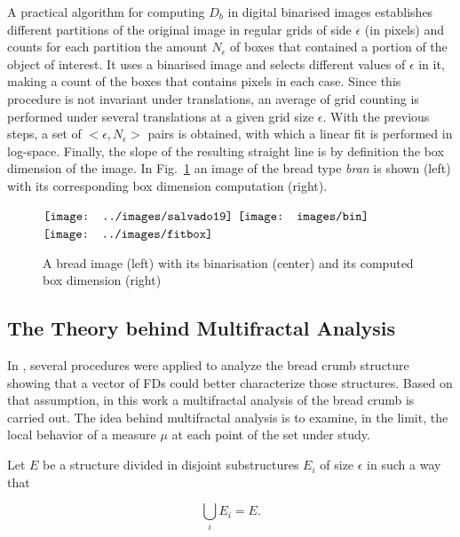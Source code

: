 A practical algorithm for computing $D_{b}$ in digital binarised images establishes different partitions of the original image in regular grids of side $\epsilon$ (in pixels) and counts for each partition the amount $N_{\epsilon}$ of boxes that contained a portion of the object of interest. It uses a binarised image and selects different values of $\epsilon$ in it, making a count of the boxes that contains pixels in each case. Since this procedure is not invariant under translations, an average of grid counting is performed under several translations at a given grid size $\epsilon$.­ With the previous steps, a set of $<\epsilon, N_\epsilon>$ pairs is obtained, with which a linear fit is performed in log-space. Finally, the slope of the resulting straight line is by definition the box dimension of the image. In Fig.~\ref{fig:fitbox} an image of the bread type {\em bran} is shown (left) with its corresponding box dimension computation (right).

\begin{figure}[htb]
\centering
$\vcenter{\hbox{\texttt{[image: ../images/salvado19]}}}$
$\vcenter{\hbox{\texttt{[image: images/bin]}}}$
$\vcenter{\hbox{\texttt{[image: ../images/fitbox]}}}$
\caption{A bread image (left) with its binarisation (center) and its computed box dimension (right)}
\label{fig:fitbox}
\end{figure}


\subsection{The Theory behind Multifractal Analysis}
\label{sec:4}

In \cite{Gonzales2008}, several procedures were applied to analyze the bread crumb structure showing that a vector of FDs could better characterize those structures. Based on that assumption, in this work a multifractal analysis of the bread crumb is carried out. The idea behind multifractal analysis is to examine, in the limit, the local behavior of a measure $\mu$ at each point of the set under study. 


Let $E$ be a structure divided in disjoint substructures $E_{i}$ of size $\epsilon$ in such a way that 

\begin{equation}
\displaystyle\bigcup_{i}E_{i} = E.
\end{equation}

